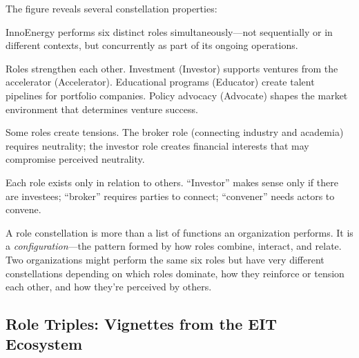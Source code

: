 \documentclass[../main.tex]{subfiles}
\begin{document}
The figure reveals several constellation properties:

\begin{description}[leftmargin=0.5cm, itemsep=0.3em]
\item[Multiplicity] InnoEnergy performs six distinct roles simultaneously---not sequentially or in different contexts, but concurrently as part of its ongoing operations.

\item[Reinforcement] Roles strengthen each other. Investment (Investor) supports ventures from the accelerator (Accelerator). Educational programs (Educator) create talent pipelines for portfolio companies. Policy advocacy (Advocate) shapes the market environment that determines venture success.

\item[Tension] Some roles create tensions. The broker role (connecting industry and academia) requires neutrality; the investor role creates financial interests that may compromise perceived neutrality.

\item[Relational definition] Each role exists only in relation to others. ``Investor'' makes sense only if there are investees; ``broker'' requires parties to connect; ``convener'' needs actors to convene.
\end{description}

\begin{insightbox}
A role constellation is more than a list of functions an organization performs. It is a \emph{configuration}---the pattern formed by how roles combine, interact, and relate. Two organizations might perform the same six roles but have very different constellations depending on which roles dominate, how they reinforce or tension each other, and how they're perceived by others.
\end{insightbox}

\subsection{Role Triples: Vignettes from the EIT Ecosystem}
\end{document}
